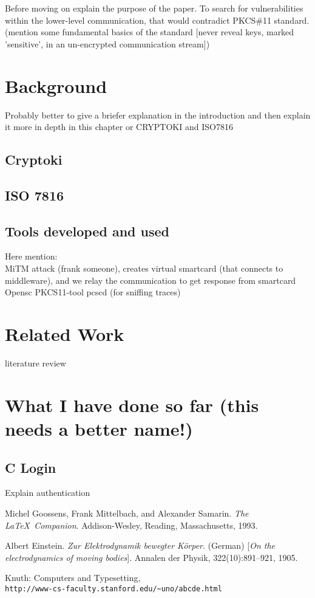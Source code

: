 \documentclass[a4paper]{report}
\begin{document}
Before moving on explain the purpose of the paper. To search for vulnerabilities within the lower-level communication, that would contradict PKCS\#11 standard. (mention some fundamental basics of the standard [never reveal keys, marked 'sensitive', in an un-encrypted communication stream])



\chapter{Background}
Probably better to give a briefer explanation in the introduction and then explain it more in depth in this chapter or CRYPTOKI and ISO7816

\section{Cryptoki}

\section{ISO 7816}

\section{Tools developed and used}
Here mention:\\
MiTM attack (frank someone), creates virtual smartcard (that connects to middleware), and we relay the communication to get response from smartcard
Opensc
PKCS11-tool
pcscd (for sniffing traces)



\chapter{Related Work}
literature review

\chapter{What I have done so far (this needs a better name!)}

\section{C Login}
Explain authentication





\newpage
\begin{thebibliography}{9}
Michel Goossens, Frank Mittelbach, and Alexander Samarin. 
\textit{The \LaTeX\ Companion}. 
Addison-Wesley, Reading, Massachusetts, 1993.
 
Albert Einstein. 
\textit{Zur Elektrodynamik bewegter K{\"o}rper}. (German) 
[\textit{On the electrodynamics of moving bodies}]. 
Annalen der Physik, 322(10):891–921, 1905.
 
Knuth: Computers and Typesetting,
\\\texttt{http://www-cs-faculty.stanford.edu/\~{}uno/abcde.html}
\end{thebibliography}
\end{document}
